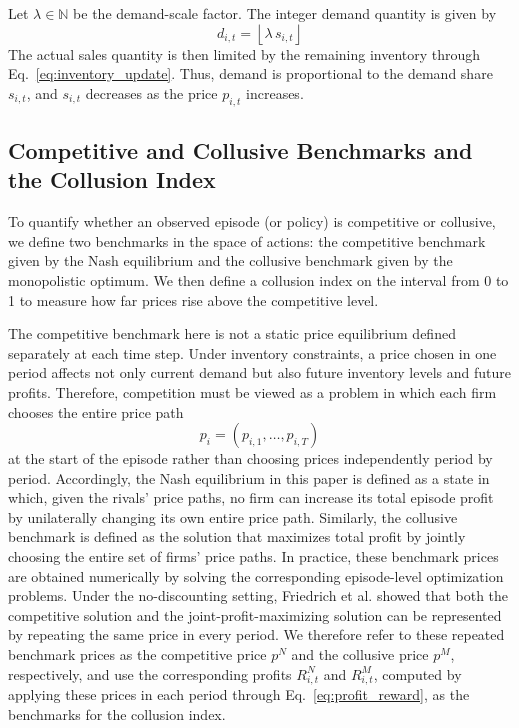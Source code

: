 \documentclass[runningheads]{llncs}
\begin{document}
Let $\lambda\in\mathbb{N}$ be the demand-scale factor.
The integer demand quantity is given by
\begin{equation}
d_{i,t}=\left\lfloor \lambda\, s_{i,t} \right\rfloor
\label{eq:scaled_demand_const}
\end{equation}
The actual sales quantity is then limited by the remaining inventory through Eq.~\eqref{eq:inventory_update}.
Thus, demand is proportional to the demand share $s_{i,t}$, and $s_{i,t}$ decreases as the price $p_{i,t}$ increases.

\subsection{Competitive and Collusive Benchmarks and the Collusion Index}
To quantify whether an observed episode (or policy) is competitive or collusive, we define two benchmarks in the space of actions: the competitive benchmark given by the Nash equilibrium and the collusive benchmark given by the monopolistic optimum.
We then define a collusion index on the interval from 0 to 1 to measure how far prices rise above the competitive level.

The competitive benchmark here is not a static price equilibrium defined separately at each time step.
Under inventory constraints, a price chosen in one period affects not only current demand but also future inventory levels and future profits.
Therefore, competition must be viewed as a problem in which each firm chooses the entire price path
\begin{equation}
p_i=(p_{i,1},\dots,p_{i,T})
\label{eq:episode_price_vector}
\end{equation}
at the start of the episode rather than choosing prices independently period by period.
Accordingly, the Nash equilibrium in this paper is defined as a state in which, given the rivals' price paths, no firm can increase its total episode profit by unilaterally changing its own entire price path.
Similarly, the collusive benchmark is defined as the solution that maximizes total profit by jointly choosing the entire set of firms' price paths.
In practice, these benchmark prices are obtained numerically by solving the corresponding episode-level optimization problems.
Under the no-discounting setting, Friedrich et al.\cite{friedrich2025learning} showed that both the competitive solution and the joint-profit-maximizing solution can be represented by repeating the same price in every period.
We therefore refer to these repeated benchmark prices as the competitive price $p^N$ and the collusive price $p^M$, respectively, and use the corresponding profits
$R^N_{i,t}$ and $R^M_{i,t}$, computed by applying these prices in each period through Eq.~\eqref{eq:profit_reward}, as the benchmarks for the collusion index.
\end{document}
